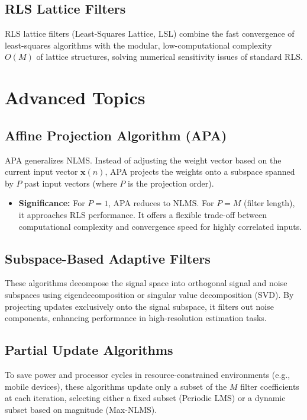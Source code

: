 \documentclass[12pt,a4paper]{article}
\begin{document}
\subsection{RLS Lattice Filters}
RLS lattice filters (Least-Squares Lattice, LSL) combine the fast convergence of least-squares algorithms with the modular, low-computational complexity $O(M)$ of lattice structures, solving numerical sensitivity issues of standard RLS.

\section{Advanced Topics}

\subsection{Affine Projection Algorithm (APA)}
APA generalizes NLMS. Instead of adjusting the weight vector based on the current input vector $\mathbf{x}(n)$, APA projects the weights onto a subspace spanned by $P$ past input vectors (where $P$ is the projection order).
\begin{itemize}[leftmargin=*, itemsep=2pt]
  \item \textbf{Significance:} For $P=1$, APA reduces to NLMS. For $P=M$ (filter length), it approaches RLS performance. It offers a flexible trade-off between computational complexity and convergence speed for highly correlated inputs.
\end{itemize}

\subsection{Subspace-Based Adaptive Filters}
These algorithms decompose the signal space into orthogonal signal and noise subspaces using eigendecomposition or singular value decomposition (SVD). By projecting updates exclusively onto the signal subspace, it filters out noise components, enhancing performance in high-resolution estimation tasks.

\subsection{Partial Update Algorithms}
To save power and processor cycles in resource-constrained environments (e.g., mobile devices), these algorithms update only a subset of the $M$ filter coefficients at each iteration, selecting either a fixed subset (Periodic LMS) or a dynamic subset based on magnitude (Max-NLMS).
\end{document}
